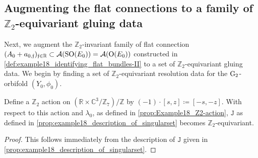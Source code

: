 \documentclass[11pt,a4paper]{scrartcl}
\newcommand{\G}{\textup{G}}
\newcommand{\SO}{\textup{SO}}
\renewcommand{\O}{\textup{O}}
\numberwithin{equation}{section}
\theoremstyle{plain}
\theoremstyle{definition}
\theoremstyle{remark}
\begin{document}
\subsection{Augmenting the flat connections to a family of $\mathbb{Z}_2$-equivariant gluing data}

Next, we augment the $\mathbb{Z}_2$-invariant family of flat connection $(A_0+a_{0,\mathfrak{f}})_{\mathfrak{f}\in \mathbb{R}} \subset \mathcal{A}(\SO(E_0)) = \mathcal{A}(\O(E_0))$ constructed in \autoref{def:example18_identifying_flat_bundles-II} to a set of $\mathbb{Z}_2$-equivariant gluing data. We begin by finding a set of $\mathbb{Z}_2$-equivariant resolution data for the $\G_2$-orbifold $(Y_0,\phi_0)$.

\begin{proposition}\label{prop:example18_equivariant_resolutiondata_1}
Define a $\mathbb{Z}_2$ action on $(\mathbb{R}\times \mathbb{C}^3/\mathbb{Z}_7)/\mathbb{Z}$ by $(-1)\cdot [s,z]\coloneqq[-s,-z]$. With respect to this action and $\lambda_0$, as defined in \autoref{prop:Example18_Z2-action}, $\mathtt{J}$ as defined in \autoref{prop:example18_description_of_singularset} becomes $\mathbb{Z}_2$-equivariant.
\end{proposition}
\begin{proof}
This follows immediately from the description of $\mathtt{J}$ given in \autoref{prop:example18_description_of_singularset}.
\end{proof}
\end{document}
